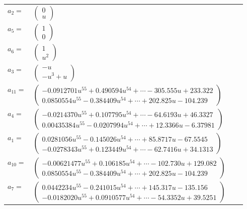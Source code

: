 \documentclass[1p]{elsarticle_modified}
\theoremstyle{definition}
\begin{document}
\begin{tabular}{m{7pt} m{180pt} m{7pt} m{180pt} }
\flushright $a_{2}=$&$\begin{pmatrix}0\\u\end{pmatrix}$ \\
\flushright $a_{5}=$&$\begin{pmatrix}1\\0\end{pmatrix}$ \\
\flushright $a_{6}=$&$\begin{pmatrix}1\\u^2\end{pmatrix}$ \\
\flushright $a_{3}=$&$\begin{pmatrix}- u\\- u^3+u\end{pmatrix}$ \\
\flushright $a_{11}=$&$\begin{pmatrix}-0.0912701 u^{55}+0.490594 u^{54}+\cdots-305.555 u+233.322\\0.0850554 u^{55}-0.384409 u^{54}+\cdots+202.825 u-104.239\end{pmatrix}$ \\
\flushright $a_{4}=$&$\begin{pmatrix}-0.0214370 u^{55}+0.107795 u^{54}+\cdots-64.6193 u+46.3327\\0.00435384 u^{55}-0.0207994 u^{54}+\cdots+12.3366 u-6.37981\end{pmatrix}$ \\
\flushright $a_{1}=$&$\begin{pmatrix}0.0281056 u^{55}-0.145026 u^{54}+\cdots+85.8717 u-67.5545\\-0.0278343 u^{55}+0.123449 u^{54}+\cdots-62.7416 u+34.1313\end{pmatrix}$ \\
\flushright $a_{10}=$&$\begin{pmatrix}-0.00621477 u^{55}+0.106185 u^{54}+\cdots-102.730 u+129.082\\0.0850554 u^{55}-0.384409 u^{54}+\cdots+202.825 u-104.239\end{pmatrix}$ \\
\flushright $a_{7}=$&$\begin{pmatrix}0.0442234 u^{55}-0.241015 u^{54}+\cdots+145.317 u-135.156\\-0.0182020 u^{55}+0.0910577 u^{54}+\cdots-54.3352 u+39.5251\end{pmatrix}$ \\

\end{tabular}
\end{document}
